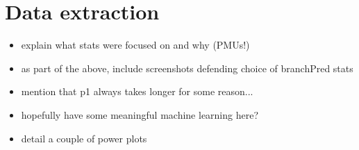 \section{Data extraction}

\begin{itemize}
    \item explain what stats were focused on and why (PMUs!)
    \item as part of the above, include screenshots defending choice of 
          branchPred stats
    \item mention that p1 always takes longer for some reason...
    \item hopefully have some meaningful machine learning here?
    \item detail a couple of power plots
\end{itemize}